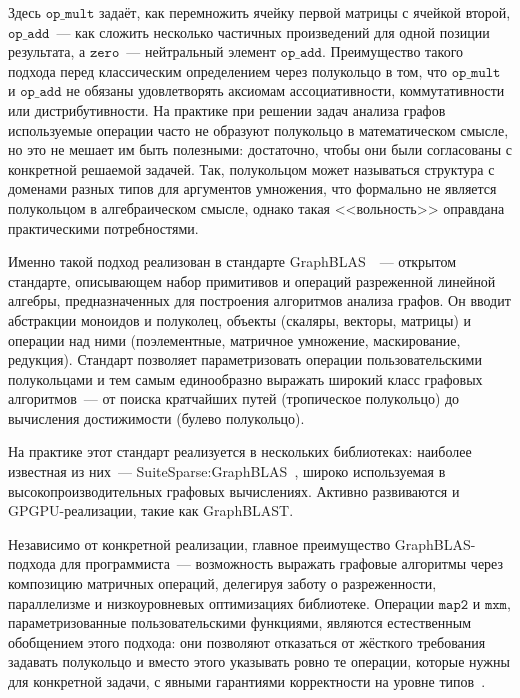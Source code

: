 Здесь $\texttt{op\_mult}$ задаёт, как перемножить ячейку первой матрицы с ячейкой второй, $\texttt{op\_add}$~--- как сложить несколько частичных произведений для одной позиции результата, а $\texttt{zero}$~--- нейтральный элемент $\texttt{op\_add}$.
Преимущество такого подхода перед классическим определением через полукольцо в том, что $\texttt{op\_mult}$ и $\texttt{op\_add}$ не обязаны удовлетворять аксиомам ассоциативности, коммутативности или дистрибутивности.
На практике при решении задач анализа графов используемые операции часто не образуют полукольцо в математическом смысле, но это не мешает им быть полезными: достаточно, чтобы они были согласованы с конкретной решаемой задачей.
Так, полукольцом может называться структура с доменами разных типов для аргументов умножения, что формально не является полукольцом в алгебраическом смысле, однако такая <<вольность>> оправдана практическими потребностями.

Именно такой подход реализован в стандарте GraphBLAS~~--- открытом стандарте, описывающем набор примитивов и операций разреженной линейной алгебры, предназначенных для построения алгоритмов анализа графов.
Он вводит абстракции моноидов и полуколец, объекты (скаляры, векторы, матрицы) и операции над ними (поэлементные, матричное умножение, маскирование, редукция).
Стандарт позволяет параметризовать операции пользовательскими полукольцами и тем самым единообразно выражать широкий класс графовых алгоритмов~--- от поиска кратчайших путей (тропическое полукольцо) до вычисления достижимости (булево полукольцо).

На практике этот стандарт реализуется в нескольких библиотеках: наиболее известная из них~--- SuiteSparse:GraphBLAS~, широко используемая в высокопроизводительных графовых вычислениях.
Активно развиваются и GPGPU-реализации, такие как GraphBLAST.

Независимо от конкретной реализации, главное преимущество GraphBLAS-подхода для программиста~--- возможность выражать графовые алгоритмы через композицию матричных операций, делегируя заботу о разреженности, параллелизме и низкоуровневых оптимизациях библиотеке.
Операции $\texttt{map2}$ и $\texttt{mxm}$, параметризованные пользовательскими функциями, являются естественным обобщением этого подхода: они позволяют отказаться от жёсткого требования задавать полукольцо и вместо этого указывать ровно те операции, которые нужны для конкретной задачи, с явными гарантиями корректности на уровне типов~.
